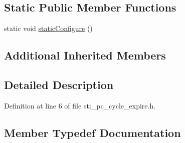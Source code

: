 \subsection*{Static Public Member Functions}
\begin{DoxyCompactItemize}
\item 
static void \hyperlink{structsm__respira__1_1_1pc__cycle__inner__states_1_1StiPCCycleExpire_a709afc5dd10c05efdd7bfe3f10de1e1d}{static\+Configure} ()
\end{DoxyCompactItemize}
\subsection*{Additional Inherited Members}


\subsection{Detailed Description}


Definition at line 6 of file sti\+\_\+pc\+\_\+cycle\+\_\+expire.\+h.



\subsection{Member Typedef Documentation}
\mbox{\label{structsm__respira__1_1_1pc__cycle__inner__states_1_1StiPCCycleExpire_a54e6154636ad367cedb77d5fa782f4c4}} 
